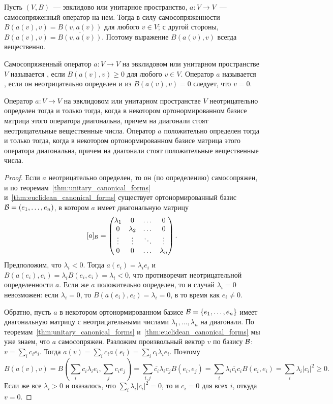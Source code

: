 Пусть $(V,B)$~--- эвклидово или унитарное пространство, $a\colon V\to
V$~--- самосопряженный оператор на нем.
Тогда в силу самосопряженности $B(a(v),v) = B(v,a(v))$ для любого $v\in
V$; с другой стороны, $B(a(v),v) = \overline{B(v,a(v))}$. Поэтому
выражение $B(a(v),v)$ всегда вещественно.

\begin{definition}
Самосопряженный оператор $a\colon V\to V$ на эвклидовом или унитарном
пространстве $V$ называется , если
$B(a(v),v)\geq 0$ для любого $v\in V$. Оператор $a$ называется
, если он
неотрицательно определен и из
$B(a(v),v)=0$ следует, что $v=0$.
\end{definition}

\begin{proposition}\label{prop:positive_definition}
Оператор $a\colon V\to V$ на эвклидовом или унитарном пространстве $V$
неотрицательно определен тогда и только тогда, когда в некотором
ортонормированном базисе матрица этого оператора диагональна, причем
на диагонали стоят неотрицательные вещественные числа.
Оператор $a$ положительно определен тогда и только тогда, когда в
некотором ортонормированном базисе матрица этого оператора
диагональна, причем на диагонали стоят положительные вещественные числа.
\end{proposition}
\begin{proof}
Если $a$ неотрицательно определен, то он (по определению)
самосопряжен, и по теоремам~\ref{thm:unitary_canonical_forms}
и~\ref{thm:euclidean_canonical_forms} существует ортонормированный
базис $\mathcal B = (e_1,\dots,e_n)$, в котором $a$ имеет
диагональную матрицу
$$
[a]_{\mathcal B} = \begin{pmatrix}\lambda_1 & 0 & \dots & 0 \\ 0 & \lambda_2 &
  \dots & 0\\ \vdots & \vdots & \ddots & \vdots \\ 0 & 0 & \dots &
  \lambda_n\end{pmatrix}.
$$
Предположим, что $\lambda_i<0$. Тогда $a(e_i) = \lambda_ie_i$ и
$B(a(e_i),e_i) = \lambda_i B(e_i,e_i) = \lambda_i < 0$, что
противоречит неотрицательной определенности $a$. Если же $a$
положительно определен, то и случай $\lambda_i=0$ невозможен: если
$\lambda_i=0$, то $B(a(e_i),e_i) = \lambda_i = 0$, в то время как
$e_i\neq 0$.

Обратно, пусть $a$ в некотором ортонормированном базисе $\mathcal
B=\{e_1,\dots,e_n\}$ имеет
диагональную матрицу с неотрицательными числами
$\lambda_1,\dots,\lambda_n$ на диагонали. По
теоремам~\ref{thm:unitary_canonical_forms}
и~\ref{thm:euclidean_canonical_forms} мы уже знаем, что $a$
самосопряжен. Разложим произвольный вектор $v$ по базису $\mathcal B$:
$v = \sum_i c_i e_i$.
Тогда $a(v) = \sum_i c_i a(e_i) = \sum_i c_i\lambda_i e_i$.
Поэтому
$$
B(a(v),v) = B(\sum_i c_i\lambda_i e_i,\sum_j c_i e_j)
= \sum_{i,j}\overline{c_i}\lambda_i c_j B(e_i,e_j)
= \sum_i\lambda_i \overline{c_i}c_i B(e_i,e_i)
= \sum_i\lambda_i |c_i|^2 \geq 0.
$$
Если же все $\lambda_i>0$ и оказалось, что $\sum_i\lambda_i
|c_i|^2=0$, то и $c_i=0$ для всех $i$, откуда $v=0$.
\end{proof}


